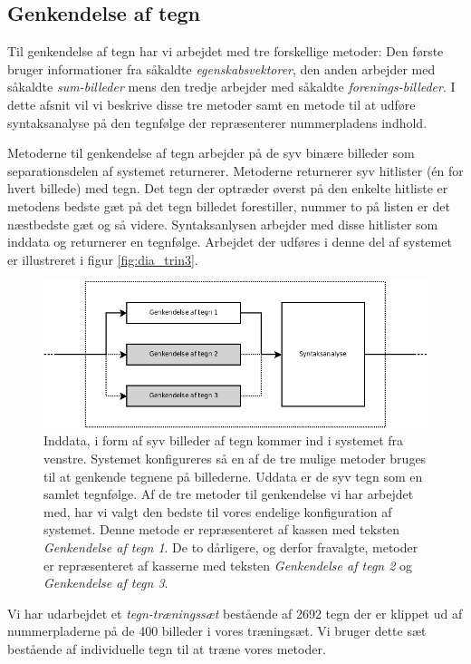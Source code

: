 \subsection{Genkendelse af tegn}
\label{sec_monster}

Til genkendelse af tegn har vi arbejdet med tre forskellige metoder: Den første bruger informationer fra såkaldte \textit{egenskabsvektorer}, den anden arbejder med såkaldte \textit{sum-billeder} mens den tredje arbejder med såkaldte \textit{forenings-billeder}. I dette afsnit vil vi beskrive disse tre metoder samt en metode til at udføre syntaksanalyse på den tegnfølge der repræsenterer nummerpladens indhold.

Metoderne til genkendelse af tegn arbejder på de syv binære billeder som separationsdelen af systemet returnerer. Metoderne returnerer syv hitlister (én for hvert billede) med tegn. Det tegn der optræder øverst på den enkelte hitliste er metodens bedste gæt på det tegn billedet forestiller, nummer to på listen er det næstbedste gæt og så videre. Syntaksanlysen arbejder med disse hitlister som inddata og returnerer en tegnfølge. Arbejdet der udføres i denne del af systemet er illustreret i figur \vref{fig:dia_trin3}.

\begin{figure}[htp]
\centering
\includegraphics[width=12cm]{system/illu/dia_trin3.png} 
\caption{Inddata, i form af syv billeder af tegn kommer ind i systemet fra venstre. Systemet konfigureres så en af de tre mulige metoder bruges til at genkende tegnene på billederne. Uddata er de syv tegn som en samlet tegnfølge. Af de tre metoder til genkendelse vi har arbejdet med, har vi valgt den bedste til vores endelige konfiguration af systemet. Denne metode er repræsenteret af kassen med teksten \textit{Genkendelse af tegn 1}. De to dårligere, og derfor fravalgte, metoder er repræsenteret af kasserne med teksten \textit{Genkendelse af tegn 2} og \textit{Genkendelse af tegn 3}.}
\label{fig:dia_trin3}
\end{figure}

Vi har udarbejdet et \textit{tegn-træningssæt} bestående af 2692 tegn der er klippet ud af nummerpladerne på de 400 billeder i vores træningsæt. Vi bruger dette sæt bestående af individuelle tegn til at træne vores metoder.


